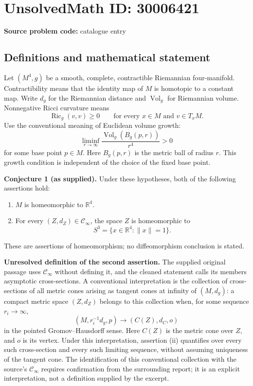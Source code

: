 \documentclass[11pt]{article}
\newcommand{\R}{\mathbb{R}}
\begin{document}
\section*{UnsolvedMath ID: 30006421}
\textbf{Source problem code:} catalogue entry
\subsection{Definitions and mathematical statement}
Let \((M^4,g)\) be a smooth, complete, contractible Riemannian four-manifold. Contractibility means that the identity map of \(M\) is homotopic to a constant map. Write \(d_g\) for the Riemannian distance and \(\operatorname{Vol}_g\) for Riemannian volume. Nonnegative Ricci curvature means
\[
\operatorname{Ric}_g(v,v)\geq 0\qquad\text{for every }x\in M\text{ and }v\in T_xM.
\]
Use the conventional meaning of Euclidean volume growth:
\[
\liminf_{r\to\infty}\frac{\operatorname{Vol}_g(B_g(p,r))}{r^4}>0
\]
for some base point \(p\in M\). Here \(B_g(p,r)\) is the metric ball of radius \(r\). This growth condition is independent of the choice of the fixed base point.

\textbf{Conjecture 1 (as supplied).} Under these hypotheses, both of the following assertions hold:
\begin{enumerate}
\item \(M\) is homeomorphic to \(\R^4\).
\item For every \((Z,d_Z)\in\mathcal C_\infty\), the space \(Z\) is homeomorphic to
\[
S^3=\{x\in\R^4:\|x\|=1\}.
\]
\end{enumerate}
These are assertions of homeomorphism; no diffeomorphism conclusion is stated.

\textbf{Unresolved definition of the second assertion.} The supplied original passage uses \(\mathcal C_\infty\) without defining it, and the cleaned statement calls its members asymptotic cross-sections. A conventional interpretation is the collection of cross-sections of all metric cones arising as tangent cones at infinity of \((M,d_g)\): a compact metric space \((Z,d_Z)\) belongs to this collection when, for some sequence \(r_i\to\infty\),
\[
(M,r_i^{-1}d_g,p)\longrightarrow (C(Z),d_C,o)
\]
in the pointed Gromov--Hausdorff sense. Here \(C(Z)\) is the metric cone over \(Z\), and \(o\) is its vertex. Under this interpretation, assertion (ii) quantifies over every such cross-section and every such limiting sequence, without assuming uniqueness of the tangent cone. The identification of this conventional collection with the source's \(\mathcal C_\infty\) requires confirmation from the surrounding report; it is an explicit interpretation, not a definition supplied by the excerpt.
\end{document}
